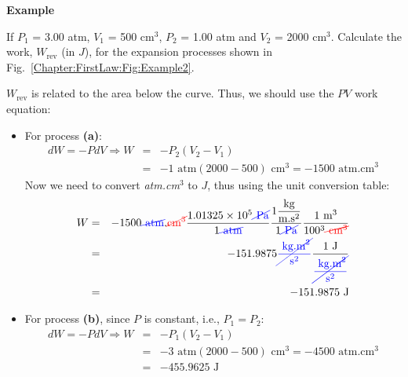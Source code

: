    \begin{MyExample}{\begin{center}{\bf Example}\end{center}}
     \begin{example}\label{Chapter:FirstLaw:Example2}
       If $P_{1}$ = 3.00 atm, $V_{1}$ = 500 cm$^{3}$, $P_{2}$ = 1.00 atm and $V_{2}$ = 2000 cm$^{3}$. Calculate the work, $W_{\text{rev}}$ (in $J$), for the expansion processes shown in Fig.~\ref{Chapter:FirstLaw:Fig:Example2}.
     \end{example}
     
        $W_{\text{rev}}$ is related to the area below the curve. Thus, we should use the $PV$ work equation:
           \begin{itemize}
              \item For process {\bf (a)}: 
                 \begin{eqnarray}
                    d W = -PdV \Longrightarrow W &=& -P_{2}\left(V_{2}-V_{1}\right) \nonumber \\
                                                 &=& - 1\text{ atm}\left(2000-500\right)\text{ cm}^{3} = -1500\text{ atm.cm}^{3} \nonumber 
                 \end{eqnarray}
                 Now we need to convert {\it atm.cm}$^{3}$ to $J$, thus using the unit conversion table:
                 \begin{eqnarray}
                     W &=& -1500\textcolor{blue}{\cancel{\text{ atm}}}.\textcolor{red}{\cancel{\text{cm}^{3}}} \displaystyle\frac{1.01325\times 10^{5}\textcolor{blue}{\cancel{\text{ Pa}}}}{1\textcolor{blue}{\cancel{\text{ atm}}}} \displaystyle\frac{1 \displaystyle\frac{\text{kg}}{\text{m.s}^{2}}}{1\textcolor{blue}{\cancel{\text{ Pa}}}} \displaystyle\frac{1\text{ m}^{3}}{ 100^{3} \textcolor{red}{\cancel{\text{ cm}^{3}}}} \nonumber \\
                       &=& -151.9875 \textcolor{blue}{\cancel{\displaystyle\frac{\text{ kg.m}^{2}}{\text{s}^{2}}}} \displaystyle\frac{ 1 \text{ J}}{ \textcolor{blue}{\cancel{\displaystyle\frac{\text{ kg.m}^{2}}{\text{s}^{2}}}}} \nonumber\\
                       &=& -151.9875\text{ J} \nonumber
                 \end{eqnarray}
%
              \item For process {\bf (b)}, since $P$ is constant, i.e., $P_{1}=P_{2}$:
                 \begin{eqnarray}
                    d W = -PdV \Longrightarrow W &=& -P_{1}\left(V_{2}-V_{1}\right) \nonumber \\
                                                 &=& - 3\text{ atm}\left(2000-500\right)\text{ cm}^{3} = -4500\text{ atm.cm}^{3} \nonumber \\
                                                 &=& -455.9625\text{ J} \nonumber
                 \end{eqnarray}
           \end{itemize}
   \end{MyExample}

